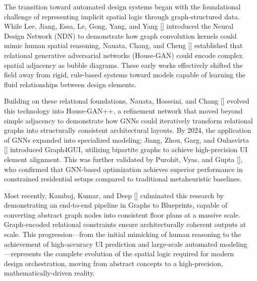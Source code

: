 \begin{refsection}
The transition toward automated design systems began with the foundational challenge of representing implicit spatial logic through graph-structured data. While Lee, Jiang, Essa, Le, Gong, Yang, and Yang [\citeyear{Lee2020Neural}] introduced the Neural Design Network (NDN) to demonstrate how graph convolution kernels could mimic human spatial reasoning, Nauata, Chang, and Cheng [\citeyear{Nauata2020HouseGAN}] established that relational generative adversarial networks (House-GAN) could encode complex spatial adjacency as bubble diagrams. These early works effectively shifted the field away from rigid, rule-based systems toward models capable of learning the fluid relationships between design elements.

Building on these relational foundations, Nauata, Hosseini, and Chang [\citeyear{Nauata2021HouseGANPlus}] evolved this technology into House-GAN++, a refinement network that moved beyond simple adjacency to demonstrate how GNNs could iteratively transform relational graphs into structurally consistent architectural layouts. By 2024, the application of GNNs expanded into specialized modeling; Jiang, Zhou, Garg, and Oulasvirta [\citeyear{Jiang2024Graph4GUI}] introduced Graph4GUI, utilizing bipartite graphs to achieve high-precision UI element alignment. This was further validated by Purohit, Vyas, and Gupta [\citeyear{Purohit2024Residential}], who confirmed that GNN-based optimization achieves superior performance in constrained residential setups compared to traditional metaheuristic baselines.

Most recently, Kamboj, Kumar, and Deep [\citeyear{Kamboj2025GNN}] culminated this research by demonstrating an end-to-end pipeline in Graphs to Blueprints, capable of converting abstract graph nodes into consistent floor plans at a massive scale. Graph-encoded relational constraints ensure architecturally coherent outputs at scale. This progression—from the initial mimicking of human reasoning to the achievement of high-accuracy UI prediction and large-scale automated modeling—represents the complete evolution of the spatial logic required for modern design orchestration, moving from abstract concepts to a high-precision, mathematically-driven reality.


\end{refsection}
